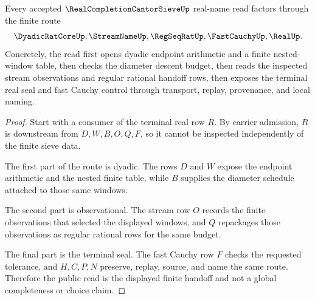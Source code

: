 \begin{theorem}
\label{thm:real-completion-cantor-sieve-finite-handoff}
Every accepted $\RealCompletionCantorSieveUp$ real-name read factors through the finite route
$$
\DyadicRatCoreUp,\StreamNameUp,\RegSeqRatUp,\FastCauchyUp,\RealUp .
$$
Concretely, the read first opens dyadic endpoint arithmetic and a finite nested-window table, then checks the diameter descent budget, then reads the inspected stream observations and regular rational handoff rows, then exposes the terminal real seal and fast Cauchy control through transport, replay, provenance, and local naming.
\end{theorem}
\begin{proof}
Start with a consumer of the terminal real row $R$. By carrier admission, $R$ is downstream from $D,W,B,O,Q,F$, so it cannot be inspected independently of the finite sieve data.

The first part of the route is dyadic. The rows $D$ and $W$ expose the endpoint arithmetic and the nested finite table, while $B$ supplies the diameter schedule attached to those same windows.

The second part is observational. The stream row $O$ records the finite observations that selected the displayed windows, and $Q$ repackages those observations as regular rational rows for the same budget.

The final part is the terminal seal. The fast Cauchy row $F$ checks the requested tolerance, and $H,C,P,N$ preserve, replay, source, and name the same route. Therefore the public read is the displayed finite handoff and not a global completeness or choice claim.
\end{proof}


